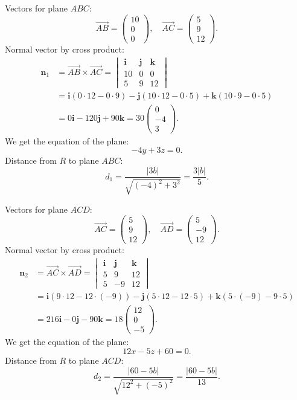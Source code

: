 \begin{enumerate}
 Vectors for plane $ABC$:
 \[\overrightarrow{AB}=\begin{pmatrix}10\\0\\0\end{pmatrix},\quad \overrightarrow{AC}=\begin{pmatrix}5\\9\\12\end{pmatrix}.\]Normal vector by cross product:\begin{align*}\mathbf{n}_1 &= \overrightarrow{AB}\times\overrightarrow{AC}= \begin{vmatrix}\mathbf{i}&\mathbf{j}&\mathbf{k}\\10&0&0\\5&9&12\end{vmatrix} \\&= \mathbf{i}(0\cdot12-0\cdot9)-\mathbf{j}(10\cdot12-0\cdot5)+\mathbf{k}(10\cdot9-0\cdot5) \\&= 0\mathbf{i}-120\mathbf{j}+90\mathbf{k}= 30\begin{pmatrix}0\\-4\\3\end{pmatrix}.\end{align*}
We get the equation of the plane:
 \[-4y + 3z = 0.\]Distance from $R$ to plane $ABC$:
 \[d_1 = \frac{|3b|}{\sqrt{(-4)^2+3^2}} = \frac{3|b|}{5}.\]

 Vectors for plane $ACD$:
 \[\overrightarrow{AC}=\begin{pmatrix}5\\9\\12\end{pmatrix},\quad \overrightarrow{AD}=\begin{pmatrix}5\\-9\\12\end{pmatrix}.\]Normal vector by cross product:\begin{align*}\mathbf{n}_2 &= \overrightarrow{AC}\times\overrightarrow{AD}= \begin{vmatrix}\mathbf{i}&\mathbf{j}&\mathbf{k}\\5&9&12\\5&-9&12\end{vmatrix} \\&= \mathbf{i}(9\cdot12-12\cdot(-9))-\mathbf{j}(5\cdot12-12\cdot5)+\mathbf{k}(5\cdot(-9)-9\cdot5) \\&= 216\mathbf{i}-0\mathbf{j}-90\mathbf{k}= 18\begin{pmatrix}12\\0\\-5\end{pmatrix}.\end{align*}
We get the equation of the plane:
 \[12x - 5z + 60 = 0.\]Distance from $R$ to plane $ACD$:
 \[d_2 = \frac{|60-5b|}{\sqrt{12^2+(-5)^2}} = \frac{|60-5b|}{13}.\]


\end{enumerate}
